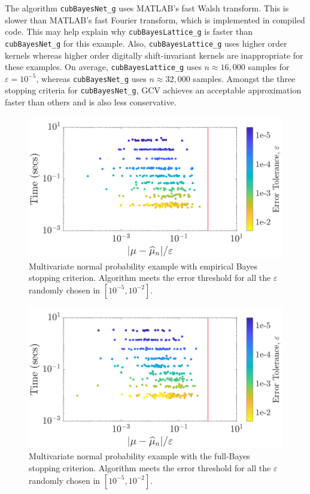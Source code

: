 \documentclass[graybox,footinfo]{svmult}
\begin{document}
The algorithm \texttt{cubBayesNet\_g} uses MATLAB's fast Walsh transform.  This is slower than MATLAB's fast Fourier transform, which is implemented in compiled code. This may help explain why \texttt{cubBayesLattice\_g} is faster than \texttt{cubBayesNet\_g} for this example. Also, \texttt{cubBayesLattice\_g} uses higher order kernels whereas higher order digitally shift-invariant kernels are inappropriate for these examples. On average, \texttt{cubBayesLattice\_g} uses $n \approx 16{,}000$ samples for $\varepsilon = 10^{-5}$, whereas \texttt{cubBayesNet\_g} uses  $n \approx 32{,}000$ samples.
Amongst the three stopping criteria for \texttt{cubBayesNet\_g}, GCV achieves an acceptable approximation faster than others and is also less conservative. 


\begin{figure}
\centering
\includegraphics[width=0.95\linewidth]{"figures/Sobol/Sobol_MVN_guaranteed_time_MLE__d2_r1_2019-Sep-1"}
\caption[Sobol: MVN guaranteed:EB]{Multivariate normal probability example with empirical Bayes stopping criterion.  Algorithm meets the error threshold for all the $\varepsilon$ randomly chosen in $[10^{-5}, 10^{-2}]$.}

\label{FJ:fig:Sobol-mvn-guaranteed-EB}
\end{figure}
\begin{figure}
\centering
\includegraphics[width=0.95\linewidth]{"figures/Sobol/Sobol_MVN_guaranteed_time_full__d2_r1_2019-Sep-1"}
\caption[Sobol: MVN guaranteed: Full Bayes]{Multivariate normal probability example with the full-Bayes stopping criterion. Algorithm meets the error threshold for all the $\varepsilon$ randomly chosen in $[10^{-5}, 10^{-2}]$.}
\label{FJ:fig:Sobol-mvn-guaranteed-FB}
\end{figure}
\end{document}
